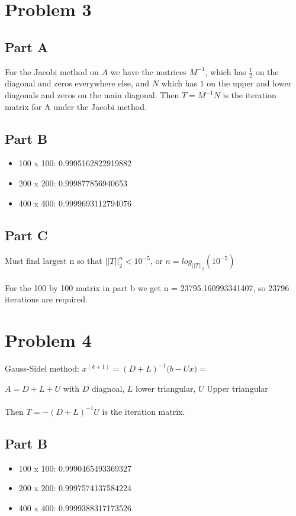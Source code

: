 \documentclass{article}
\begin{document}
\section*{Problem 3}

\subsection*{Part A}
For the Jacobi method on $A$ we have the matrices $M^{-1}$, which has $\frac{1}{2}$ on the diagonal and zeros everywhere else, and $N$ which has $1$ on the upper and lower diagonals and zeros on the main diagonal. Then $T = M^{-1}N$ is the iteration matrix for A under the Jacobi method.

\subsection*{Part B}
\begin{itemize}
    \item 100 x 100: 0.9995162822919882
    \item 200 x 200: 0.999877856940653
    \item 400 x 400: 0.9999693112794076
\end{itemize}

\subsection*{Part C}
Must find largest n so that \( ||T||_2^n < 10^{-5} \), or \( n = log_{||T||_2}(10^{-5}) \)\\
\\
For the 100 by 100 matrix in part b we get n = 23795.160993341407, so 23796 iterations are required.

\section*{Problem 4}
Gauss-Sidel method: \( x^{(k+1)} = (D+L)^{-1}\big(b - Ux\big) = \)

\( A = D + L + U \) with $D$ diagnoal, $L$ lower triangular, $U$ Upper triangular\\
\\
Then $T = -(D+L)^{-1}U$ is the iteration matrix.

\subsection*{Part B}
\begin{itemize}
    \item 100 x 100: 0.9990465493369327
    \item 200 x 200: 0.9997574137584224
    \item 400 x 400: 0.9999388317173526
\end{itemize}
\end{document}
